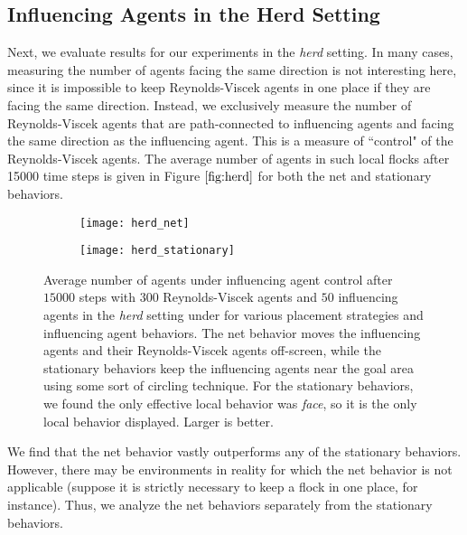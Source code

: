 \subsection{Influencing Agents in the Herd Setting}
Next, we evaluate results for our experiments in the \textit{herd} setting.
In many cases, measuring the number of agents facing the same direction is not
interesting here, since it is impossible to keep Reynolds-Viscek agents in one place
if they are facing the same direction.
Instead, we exclusively measure the number of Reynolds-Viscek agents that are
path-connected to influencing agents and facing the same direction as the influencing
agent.
This is a measure of ``control" of the Reynolds-Viscek agents.
The average number of agents in such local flocks after 15000 time steps is given
in Figure $\ref{fig:herd}$ for both the net and stationary behaviors.
\begin{figure}
    \centering
    \begin{subfigure}[b]{0.7\textwidth}
        \texttt{[image: herd\_net]}
    \end{subfigure}
    \begin{subfigure}[b]{0.7\textwidth}
        \texttt{[image: herd\_stationary]}
    \end{subfigure}
    \caption{Average number of agents under influencing agent control after $15000$
    steps with $300$ Reynolds-Viscek agents and $50$ influencing agents in the
    \textit{herd} setting under for various placement strategies
    and influencing agent behaviors.
    The net behavior moves the influencing agents and their Reynolds-Viscek agents
    off-screen, while the stationary behaviors keep the influencing agents near
    the goal area using some sort of circling technique.
    For the stationary behaviors, we found the only effective local behavior
    was \textit{face}, so it is the only local behavior displayed.
    Larger is better.}
    \label{fig:herd}
\end{figure}
We find that the net behavior vastly outperforms any of the stationary
behaviors.
However, there may be environments in reality for which the net behavior is not
applicable (suppose it is strictly necessary to keep a flock in one place, for
instance).
Thus, we analyze the net behaviors separately from the stationary behaviors.

